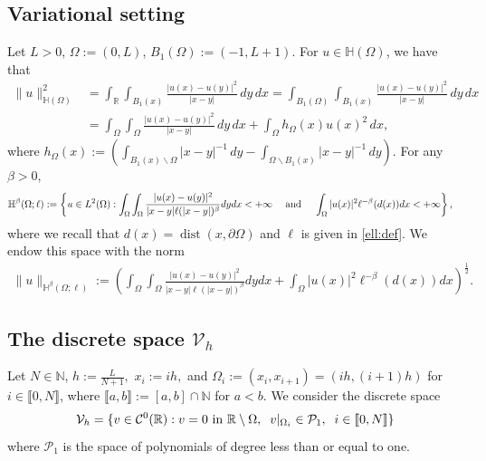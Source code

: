\documentclass[11 pt]{article}
\newcommand\inter[1]{\llbracket #1\rrbracket}
\numberwithin{equation}{section}
\newcommand{\weH}[1]{\mathbb H^{#1}(\Omega;\ell)}
\def\R{\mathbb{R}}
\def\mH{\mathbb{H}}
\begin{document}
\subsection{Variational setting}
Let $L>0$, $\Omega:=(0,L)$, $B_1(\Omega):=(-1,L+1)$. For $u\in \mH(\Omega)$, we have that
\begin{align*}
    \|u\|^2_{\mathbb H(\Omega)}&=\int_{\R}\int_{B_1(x)}\frac{|u(x)-u(y)|^2}{|x-y|}\, dy\, dx
    =\int_{B_1(\Omega)}\int_{B_1(x)}\frac{|u(x)-u(y)|^2}{|x-y|}\, dy\, dx\\
    &=\int_\Omega\int_\Omega \frac{|u(x)-u(y)|^2}{|x-y|}\, dy\, dx+\int_{\Omega}h_\Omega(x)u(x)^2\, dx,
\end{align*}
where $h_\Omega(x):=\left(\int_{B_1(x)\backslash \Omega}|x-y|^{-1}\, dy - \int_{\Omega\backslash B_1(x)}|x-y|^{-1}\, dy\right).$ For any $\beta>0$,
%
\begin{align}
    \weH{\beta}&:=\left\{ u\in L^2(\Omega): \int_{\Omega}\int_{\Omega}\frac{|u(x)-u(y)|^2}{|x-y|\ell(|x-y|)^{\beta}}dydx<+\infty \quad\textnormal{ and }\quad  \int_{\Omega}|u(x)|^2\ell^{-\beta}(d(x))dx <+\infty\right\},\label{H:weights:def}
\end{align}
where we recall that $d(x)=\operatorname{dist}(x,\partial \Omega)$ and $\ell$ is given in \eqref{ell:def}.  We endow this space with the norm
\begin{align}\label{Hbetanorm}
 \|u\|_{\mathbb H^\beta(\Omega;\ell)}:=\left(
 \int_{\Omega}\int_{\Omega}\frac{|u(x)-u(y)|^2}{|x-y|\ell(|x-y|)^{\beta}}dydx+\int_{\Omega}|u(x)|^2\ell^{-\beta}(d(x))dx
 \right)^\frac{1}{2}.
\end{align}



\subsection{The discrete space
\texorpdfstring{$\mathcal V_h$}{Vh}
}

Let $N\in \mathbb N$, $h:=\frac{L}{N+1},$ $x_i:=ih,$ and $\Omega_i:=(x_i,x_{i+1})=(ih,(i+1)h)$ for $i\in\inter{0,N}$, where $\inter{a,b}:=[a,b]\cap\mathbb{N}$ for $a<b$. We consider the discrete space
%
\begin{equation}\label{Vh:def}
    \mathcal V_h=\{v\in \mathcal C^0(\R): v=0 \textnormal{ in } \R\setminus \Omega, \;\; v|_{\Omega_i}\in \mathcal P_1, \;\;  i\in\inter{0,N}\}
\end{equation}
%
where $\mathcal P_1$ is the space of polynomials of degree less than or equal to one. 
\end{document}
